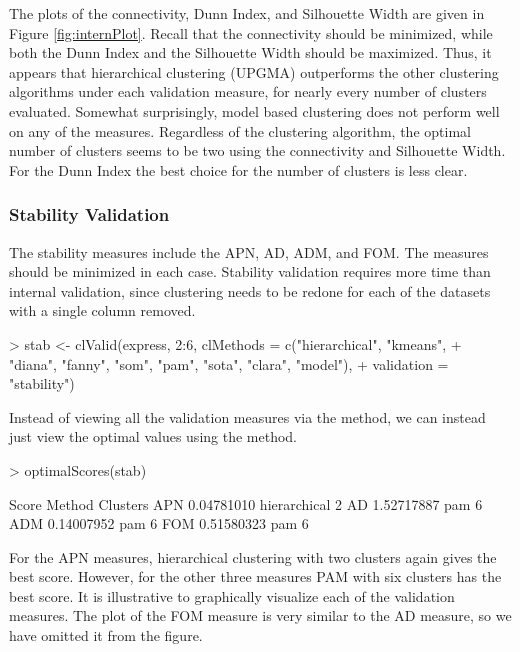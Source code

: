 \documentclass[11pt]{article}
\begin{document}
The plots of the connectivity, Dunn Index, and Silhouette Width are given in 
Figure \ref{fig:internPlot}.
Recall that the connectivity should be minimized, while both the Dunn
Index and the Silhouette Width should be maximized.  Thus, it appears
that hierarchical clustering (UPGMA) 
outperforms the other clustering algorithms under each validation
measure, for nearly every number of clusters
evaluated.
Somewhat surprisingly, model based clustering does not perform well
on any of the measures.
Regardless of the clustering algorithm, 
the optimal number of clusters seems to be two using the connectivity and
Silhouette Width.  For the Dunn Index the best choice for the number of
clusters is less clear.  

\subsubsection*{Stability Validation}

The stability measures include the APN, AD, ADM, and FOM.  The
measures should be minimized in each case.  Stability validation
requires more time than internal validation, since clustering needs to
be redone for each of the datasets with a single column removed.  

\begin{Schunk}
\begin{Sinput}
> stab <- clValid(express, 2:6, clMethods = c("hierarchical", "kmeans", 
+     "diana", "fanny", "som", "pam", "sota", "clara", "model"), 
+     validation = "stability")
\end{Sinput}
\end{Schunk}

Instead of viewing all the validation measures via the 
method, we can instead just view the optimal values using the
 method.

\begin{Schunk}
\begin{Sinput}
> optimalScores(stab)
\end{Sinput}
\begin{Soutput}
         Score       Method Clusters
APN 0.04781010 hierarchical        2
AD  1.52717887          pam        6
ADM 0.14007952          pam        6
FOM 0.51580323          pam        6
\end{Soutput}
\end{Schunk}

For the APN measures, hierarchical clustering with two
clusters again gives the best score.  However, for the other three
measures PAM with six clusters has the best score.  It
is illustrative to graphically visualize each of the validation
measures.  The plot of the FOM measure is very similar to the AD measure, so we
have omitted it from the figure.
\end{document}

